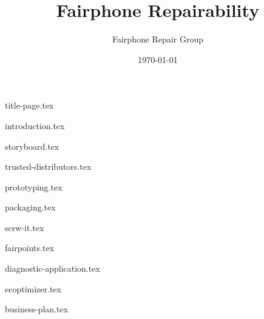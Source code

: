 \documentclass[final,a4paper]{report} %
\author{Fairphone Repair Group}
\title{Fairphone Repairability}
\date{\today}
\begin{document}
{title-page.tex}
\newpage
\tableofcontents

\newpage
{}
\pagestyle{fancy}
{introduction.tex}

{storyboard.tex}

{trusted-distributors.tex}

{prototyping.tex}

{packaging.tex}

{scrw-it.tex}

{fairpoints.tex}

{diagnostic-application.tex}

{ecoptimizer.tex}

{business-plan.tex}

\clearpage

\pagestyle{plain}
\printbibliography[heading=bibintoc]

\end{document}
